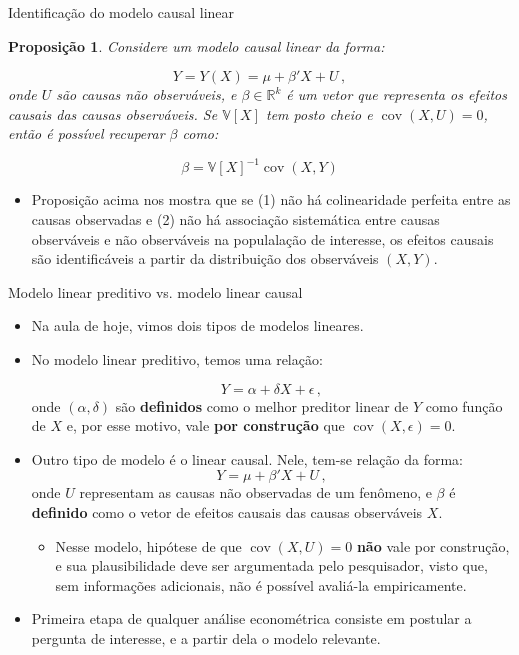 \documentclass[11pt]{beamer}
\newtheorem{proposition}{Proposição}
\begin{document}
\begin{frame}{Identificação do modelo causal linear}
	\begin{proposition}
		Considere um modelo causal linear da forma:
		
		$$Y =Y(X) = \mu + \beta' X + U\, ,$$
		onde $U$ são causas não observáveis, e $\beta \in \mathbb{R}^k$ é um vetor que representa os efeitos causais das causas observáveis. Se $\mathbb{V}[X]$ tem posto cheio e $\operatorname{cov}(X,U) =0$, então é possível recuperar $\beta$ como:
		
		$$\beta = \mathbb{V}[X]^{-1}\operatorname{cov}(X,Y)$$
	\end{proposition}
	\begin{itemize}
		\item 	Proposição acima nos mostra que se (1) não há colinearidade perfeita entre as causas observadas e (2) não há associação sistemática entre causas observáveis e não observáveis na populalação de interesse, os efeitos causais são {\color{blue}identificáveis} a partir da distribuição dos observáveis $(X,Y)$.
	\end{itemize}

\end{frame}

\begin{frame}{Modelo linear preditivo vs. modelo linear causal}
	\begin{itemize}
		\item Na aula de hoje, vimos dois tipos de modelos lineares.
		\item No modelo linear preditivo, temos uma relação:
		
		$$Y = \alpha + \delta X + \epsilon\, ,$$
		onde $(\alpha,\delta)$ são \textbf{\color{blue}definidos} como o melhor preditor linear de $Y$ como função de $X$ e, por esse motivo, vale \textbf{\color{blue}por construção}  que $\operatorname{cov}(X,\epsilon) = 0$.
		\item  Outro tipo de modelo é o linear causal. Nele, tem-se relação da forma:
				$$Y = \mu + \beta' X + U\, ,$$
				onde $U$ representam as causas não observadas de um fenômeno, e $\beta$ é {\color{green}\textbf{definido}} como o vetor de efeitos causais das causas observáveis $X$.
				\begin{itemize}
					\item Nesse modelo, hipótese de que $\operatorname{cov}(X,U)=0$ \textbf{\color{red}não} vale por construção, e sua plausibilidade deve ser argumentada pelo pesquisador, visto que, sem informações adicionais, não é possível avaliá-la empiricamente.
				\end{itemize}
		\item Primeira etapa de qualquer análise econométrica consiste em postular a pergunta de interesse, e a partir dela o modelo relevante.
	\end{itemize}
\end{frame}
\end{document}
